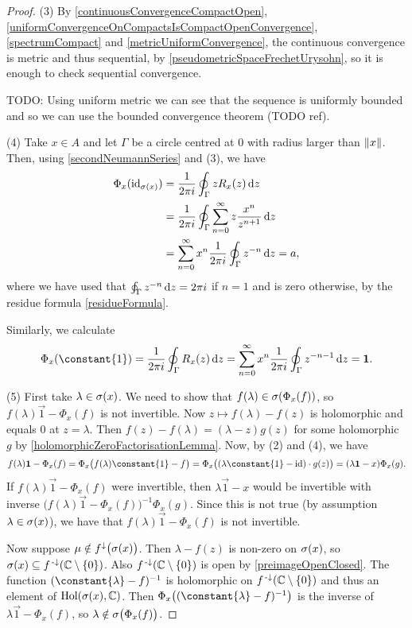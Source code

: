 \begin{proof}
(3) By \ref{continuousConvergenceCompactOpen}, \ref{uniformConvergenceOnCompactsIsCompactOpenConvergence}, \ref{spectrumCompact} and \ref{metricUniformConvergence}, the continuous convergence is metric and thus sequential, by \ref{pseudometricSpaceFrechetUrysohn}, so it is enough to check sequential convergence.

TODO: Using uniform metric we can see that the sequence is uniformly bounded and so we can use the bounded convergence theorem (TODO ref).

(4) Take $x\in A$ and let $\Gamma$ be a circle centred at $0$ with radius larger than $\lVert x\rVert$. Then, using \ref{secondNeumannSeries} and (3), we have
\begin{align*}
\Phi_x(\operatorname{id}_{\sigma(x)}) &= \frac{1}{2\pi i}\oint_\Gamma zR_x(z)\operatorname{d \!}{z} \\
&= \frac{1}{2\pi i}\oint_\Gamma \sum_{n=0}^\infty z\frac{x^n}{z^{n+1}}\operatorname{d \!}{z} \\
&= \sum_{n=0}^\infty x^n \frac{1}{2\pi i}\oint_\Gamma  z^{-n}\operatorname{d \!}{z} = a,
\end{align*}
where we have used that $\oint_\Gamma  z^{-n}\operatorname{d \!}{z} = 2\pi i$ if $n = 1$ and is zero otherwise, by the residue formula \ref{residueFormula}.

Similarly, we calculate
\begin{align*}
\Phi_x(\constant{1}) = \frac{1}{2\pi i}\oint_\Gamma R_x(z)\diff{z} = \sum_{n=0}^\infty x^n \frac{1}{2\pi i}\oint_\Gamma  z^{-n-1}\diff{z} = \vec{1}.
\end{align*}

(5) First take $\lambda\in\sigma(x)$. We need to show that $f(\lambda)\in \sigma(\Phi_x(f))$, so $f(\lambda)\vec{1} - \Phi_x(f)$ is not invertible. Now $z\mapsto f(\lambda)- f(z)$ is holomorphic and equals $0$ at $z=\lambda$. Then $f(z) - f(\lambda) = (\lambda - z)g(z)$ for some holomorphic $g$ by \ref{holomorphicZeroFactorisationLemma}. Now, by (2) and (4), we have
\[ f(\lambda)\vec{1} - \Phi_x(f) = \Phi_x\big(f(\lambda)\constant{1} - f\big) = \Phi_x\big((\lambda\constant{1} - \id)\cdot g(z)\big) = (\lambda\vec{1} - x)\Phi_x(g). \]
If $f(\lambda)\vec{1} - \Phi_x(f)$ were invertible, then $\lambda\vec{1} - x$ would be invertible with inverse $\big(f(\lambda)\vec{1} - \Phi_x(f)\big)^{-1}\Phi_x(g)$. Since this is not true (by assumption $\lambda\in\sigma(x)$), we have that $f(\lambda)\vec{1} - \Phi_x(f)$ is not invertible.

Now suppose $\mu\notin f^\downarrow\big(\sigma(x)\big)$. Then $\lambda - f(z)$ is non-zero on $\sigma(x)$, so $\sigma(x) \subseteq f^{\text{\hspace{0.15em}-}\downarrow}(\mathbb{C}\setminus\{0\})$. Also $f^{\text{\hspace{0.15em}-}\downarrow}(\mathbb{C}\setminus\{0\})$ is open by \ref{preimageOpenClosed}. The function $(\constant{\lambda} - f)^{-1}$ is holomorphic on $f^{\text{\hspace{0.15em}-}\downarrow}(\mathbb{C}\setminus\{0\})$ and thus an element of $\operatorname{Hol}(\sigma(x),\mathbb{C})$. Then $\Phi_x\big((\constant{\lambda} - f)^{-1}\big)$ is the inverse of $\lambda \vec{1} - \Phi_x(f)$, so $\lambda \notin \sigma\big(\Phi_x(f)\big)$.
\end{proof}

